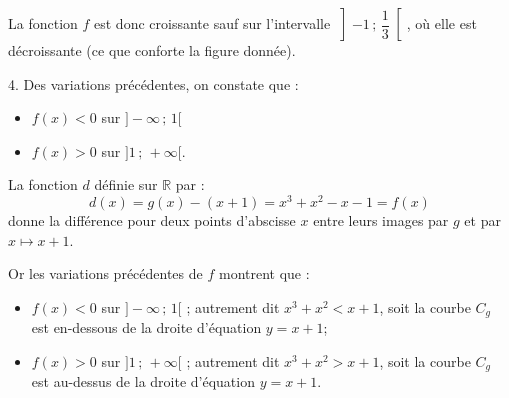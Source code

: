 	
	La fonction \( f \) est donc croissante sauf sur l'intervalle \( \left] -1 \, ; \, \dfrac{1}{3} \right[ \), où elle est décroissante (ce que conforte la figure donnée).
	
	4. Des variations précédentes, on constate que :
	\begin{itemize}
		\item $f(x) < 0$ sur $ ]-\infty \,;\, 1[$ 
		\item $f(x) > 0$  sur $]1 \,;\, +\infty[$.
	\end{itemize}
	
	La fonction \(d\) définie sur \(\mathbb{R}\) par :
	\[
	d(x) = g(x) - (x + 1) = x^3 + x^2 - x - 1 = f(x)
	\]
	donne la différence pour deux points d'abscisse \(x\) entre leurs images par \(g\) et par \(x \mapsto x + 1\).
	
	Or les variations précédentes de \(f\) montrent que :
	\begin{itemize}[label=-]
		\item \(f(x) < 0\) sur \( ]-\infty \,;\, 1[ \) ; autrement dit \(x^3 + x^2 < x + 1\), soit la courbe \(C_g\) est en-dessous de la droite d'équation \(y = x + 1\);
		\item \(f(x) > 0\) sur \( ]1 \,;\, +\infty[ \) ; autrement dit \(x^3 + x^2 > x + 1\), soit la courbe \(C_g\) est au-dessus de la droite d'équation \(y = x + 1\).
	\end{itemize}
